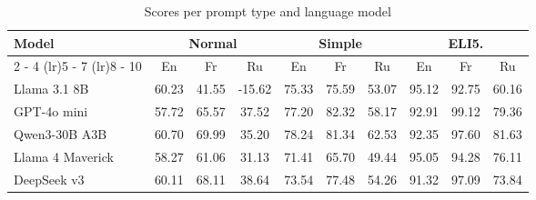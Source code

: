 \documentclass{article}%
\begin{document}
%
\normalsize%


\begin{table}[h!]%
\centering%
\small%
\setlength{\tabcolsep}{4pt}%
\begin{tabular}{@{}lccccccccc@{}}%
\toprule%
\textbf{Model} & \multicolumn{3}{c}{\textbf{Normal}} & \multicolumn{3}{c}{\textbf{Simple}} & \multicolumn{3}{c}{\textbf{ELI5.}} \\%
\cmidrule(lr){2%
-%
4}%
\cmidrule(lr){5%
-%
7}%
\cmidrule(lr){8%
-%
10}%
&En&Fr&Ru&En&Fr&Ru&En&Fr&Ru\\%
\midrule%
Llama 3.1 8B&60.23&41.55&{-}15.62&75.33&75.59&53.07&95.12&92.75&60.16\\%
GPT{-}4o mini&57.72&65.57&37.52&77.20&82.32&58.17&92.91&99.12&79.36\\%
Qwen3{-}30B A3B&60.70&69.99&35.20&78.24&81.34&62.53&92.35&97.60&81.63\\%
Llama 4 Maverick&58.27&61.06&31.13&71.41&65.70&49.44&95.05&94.28&76.11\\%
DeepSeek v3&60.11&68.11&38.64&73.54&77.48&54.26&91.32&97.09&73.84\\\bottomrule%
%
\end{tabular}%
\caption{Scores per prompt type and language model}%
\end{table}

%
\end{document}
